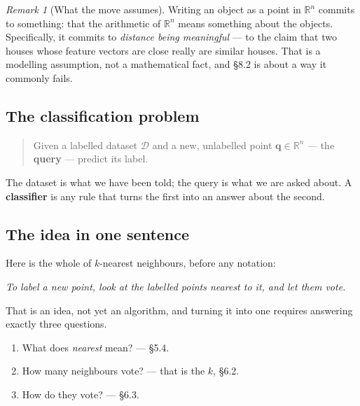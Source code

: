 \documentclass[11pt]{article}
\theoremstyle{plain}
\theoremstyle{definition}
\theoremstyle{remark}
\newtheorem*{rmk}{Remark}
\newcommand{\R}{\mathbb{R}}
\newcommand{\vc}[1]{\mathbf{#1}}
\newcommand{\D}{\mathcal{D}}
\begin{document}
\begin{rmk}[What the move assumes]
Writing an object as a point in $\R^{n}$ commits to something: that the
arithmetic of $\R^{n}$ means something about the objects. Specifically, it
commits to \emph{distance being meaningful} --- to the claim that two houses
whose feature vectors are close really are similar houses. That is a modelling
assumption, not a mathematical fact, and \S8.2 is about a way it commonly fails.
\end{rmk}

\subsection{The classification problem}
\begin{quote}
Given a labelled dataset $\D$ and a new, unlabelled point $\vc{q}\in\R^{n}$ ---
the \textbf{query} --- predict its label.
\end{quote}

\noindent The dataset is what we have been told; the query is what we are asked
about. A \textbf{classifier} is any rule that turns the first into an answer
about the second.

\subsection{The idea in one sentence}
Here is the whole of $k$-nearest neighbours, before any notation:

\begin{center}
\emph{To label a new point, look at the labelled points nearest to it, and let
them vote.}
\end{center}

\noindent That is an idea, not yet an algorithm, and turning it into one
requires answering exactly three questions.

\begin{enumerate}[label=\textbf{Q\arabic*.},leftmargin=2.6em,itemsep=4pt]
  \item What does \emph{nearest} mean? --- \S5.4.
  \item How many neighbours vote? --- that is the $k$, \S6.2.
  \item How do they vote? --- \S6.3.
\end{enumerate}
\end{document}
